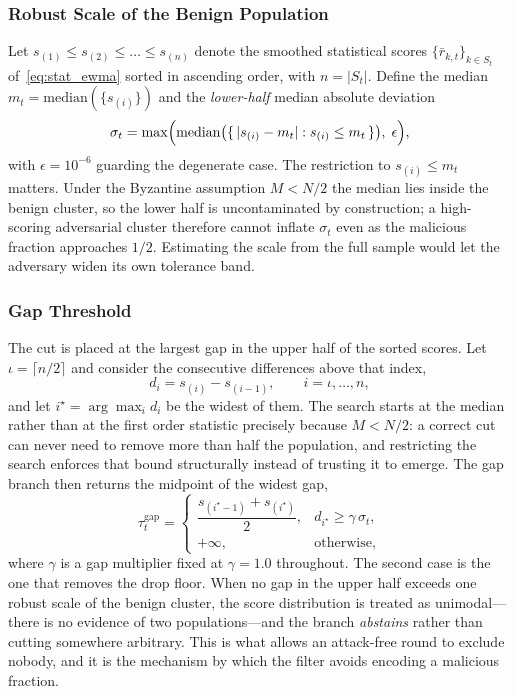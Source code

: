 \documentclass[journal]{IEEEtran}
\begin{document}
\subsubsection{Robust Scale of the Benign Population}
Let $s_{(1)} \le s_{(2)} \le \dots \le s_{(n)}$ denote the smoothed statistical scores $\{\bar r_{k,t}\}_{k \in S_t}$ of~\eqref{eq:stat_ewma} sorted in ascending order, with $n = |S_t|$. Define the median $m_t = \mathrm{median}(\{s_{(i)}\})$ and the \emph{lower-half} median absolute deviation
\begin{equation}
\sigma_t = \max\Bigl( \mathrm{median}\bigl(\{\,|s_{(i)} - m_t| : s_{(i)} \le m_t \,\}\bigr),\; \epsilon \Bigr),
\label{eq:benign_scale}
\end{equation}
with $\epsilon = 10^{-6}$ guarding the degenerate case. The restriction to $s_{(i)} \le m_t$ matters. Under the Byzantine assumption $M < N/2$ the median lies inside the benign cluster, so the lower half is uncontaminated by construction; a high-scoring adversarial cluster therefore cannot inflate $\sigma_t$ even as the malicious fraction approaches $1/2$. Estimating the scale from the full sample would let the adversary widen its own tolerance band.

\subsubsection{Gap Threshold}
The cut is placed at the largest gap in the upper half of the sorted scores. Let $\iota = \lceil n/2 \rceil$ and consider the consecutive differences above that index,
\begin{equation}
d_i = s_{(i)} - s_{(i-1)}, \qquad i = \iota, \dots, n,
\label{eq:gaps}
\end{equation}
and let $i^\star = \arg\max_i d_i$ be the widest of them. The search starts at the median rather than at the first order statistic precisely because $M < N/2$: a correct cut can never need to remove more than half the population, and restricting the search enforces that bound structurally instead of trusting it to emerge. The gap branch then returns the midpoint of the widest gap,
\begin{equation}
\tau_t^{\mathrm{gap}} =
\begin{cases}
\dfrac{s_{(i^\star - 1)} + s_{(i^\star)}}{2}, & d_{i^\star} \ge \gamma\,\sigma_t,\\[2ex]
+\infty, & \text{otherwise},
\end{cases}
\label{eq:gap_threshold}
\end{equation}
where $\gamma$ is a gap multiplier fixed at $\gamma = 1.0$ throughout. The second case is the one that removes the drop floor. When no gap in the upper half exceeds one robust scale of the benign cluster, the score distribution is treated as unimodal---there is no evidence of two populations---and the branch \emph{abstains} rather than cutting somewhere arbitrary. This is what allows an attack-free round to exclude nobody, and it is the mechanism by which the filter avoids encoding a malicious fraction.
\end{document}
